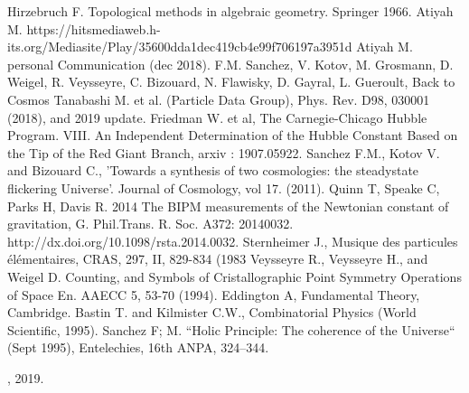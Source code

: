 \documentclass[a4paper,9pt]{article}
\begin{document}
\begin{thebibliography}{1}

 Hirzebruch F. Topological methods in algebraic geometry. Springer 1966.
 Atiyah M. https://hitsmediaweb.h-its.org/Mediasite/Play/35600dda1dec419cb4e99f706197a3951d 
 Atiyah M. personal Communication (dec 2018).
 F.M. Sanchez, V. Kotov, M. Grosmann, D. Weigel, R. Veysseyre, C. Bizouard, N. Flawisky, D. Gayral, L. Gueroult, Back to Cosmos
 Tanabashi M. et al. (Particle Data Group), Phys. Rev. D98, 030001 (2018), and 2019 update.
 Friedman W. et al, The Carnegie-Chicago Hubble Program. VIII. An Independent Determination
of the Hubble Constant Based on the Tip of the Red Giant Branch, arxiv : 1907.05922.
 Sanchez F.M., Kotov V. and Bizouard C., 'Towards a synthesis of two cosmologies: the steadystate flickering Universe'. Journal of Cosmology, vol 17. (2011).
 Quinn T, Speake C, Parks H, Davis R. 2014 The BIPM measurements of the Newtonian constant
of gravitation, G. Phil.Trans. R. Soc. A372: 20140032. http://dx.doi.org/10.1098/rsta.2014.0032.
 Sternheimer J., Musique des particules élémentaires, CRAS, 297, II, 829-834 (1983
 Veysseyre R., Veysseyre H., and Weigel D. Counting, and Symbols of Cristallographic Point
Symmetry Operations of Space En. AAECC 5, 53-70 (1994).
 Eddington A, Fundamental Theory, Cambridge.
 Bastin T. and Kilmister C.W., Combinatorial Physics (World Scientific, 1995).
 Sanchez F; M. ``Holic Principle: The coherence of the Universe`` (Sept 1995), Entelechies, 16th ANPA, 324--344.

, 2019.
\end{thebibliography}
\end{document}
